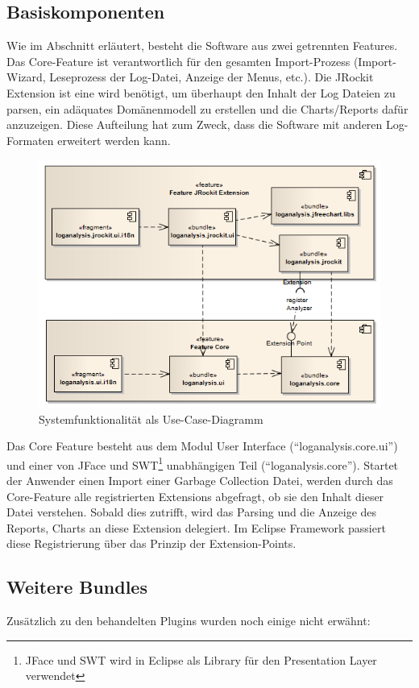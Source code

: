 \subsection{Basiskomponenten}
Wie im Abschnitt  erläutert, besteht die Software aus zwei getrennten Features. Das Core-Feature ist verantwortlich für den gesamten Import-Prozess (Import-Wizard, Leseprozess der Log-Datei, Anzeige der Menus, etc.). Die JRockit Extension ist eine wird benötigt, um überhaupt den Inhalt der Log Dateien zu parsen, ein adäquates Domänenmodell zu erstellen und die Charts/Reports dafür anzuzeigen. Diese Aufteilung hat zum Zweck, dass die Software mit anderen Log-Formaten erweitert werden kann.
 \begin{figure}[H]
  	\centering
        	\caption{Systemfunktionalität als Use-Case-Diagramm}
    	\includegraphics[width=15cm]{images/architektur_komponenten_uebersicht}
\end{figure}

Das Core Feature besteht aus dem Modul User Interface (``loganalysis.core.ui'') und einer von JFace und SWT\footnote{JFace und SWT wird in Eclipse als Library für den Presentation Layer verwendet} unabhängigen Teil (``loganalysis.core''). Startet der Anwender einen Import einer Garbage Collection Datei, werden durch das Core-Feature alle registrierten Extensions abgefragt, ob sie den Inhalt dieser Datei verstehen. Sobald dies zutrifft, wird das Parsing und die Anzeige des Reports, Charts an diese Extension delegiert. Im Eclipse Framework passiert diese Registrierung über das Prinzip der Extension-Points.

\subsection{Weitere Bundles}
Zusätzlich zu den behandelten Plugins wurden noch einige nicht erwähnt:

